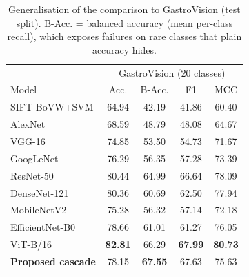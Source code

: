 \begin{table}[t]
\caption{Generalisation of the comparison to GastroVision (test split). B-Acc. = balanced accuracy
(mean per-class recall), which exposes failures on rare classes that plain accuracy hides.}
\label{tab:multidb}\centering
\begin{tabular}{lcccc}\toprule
 & \multicolumn{4}{c}{GastroVision (20 classes)}\\
Model & Acc. & B-Acc. & F1 & MCC\\\midrule
SIFT-BoVW+SVM & 64.94 & 42.19 & 41.86 & 60.40 \\
AlexNet & 68.59 & 48.79 & 48.08 & 64.67 \\
VGG-16 & 74.85 & 53.50 & 54.73 & 71.67 \\
GoogLeNet & 76.29 & 56.35 & 57.28 & 73.39 \\
ResNet-50 & 80.44 & 64.99 & 66.64 & 78.09 \\
DenseNet-121 & 80.36 & 60.69 & 62.50 & 77.94 \\
MobileNetV2 & 75.28 & 56.32 & 57.14 & 72.18 \\
EfficientNet-B0 & 78.66 & 61.01 & 61.27 & 76.05 \\
ViT-B/16 & \textbf{82.81} & 66.29 & \textbf{67.99} & \textbf{80.73} \\\midrule
\textbf{Proposed cascade} & 78.15 & \textbf{67.55} & 67.63 & 75.63 \\
\bottomrule\end{tabular}\end{table}
